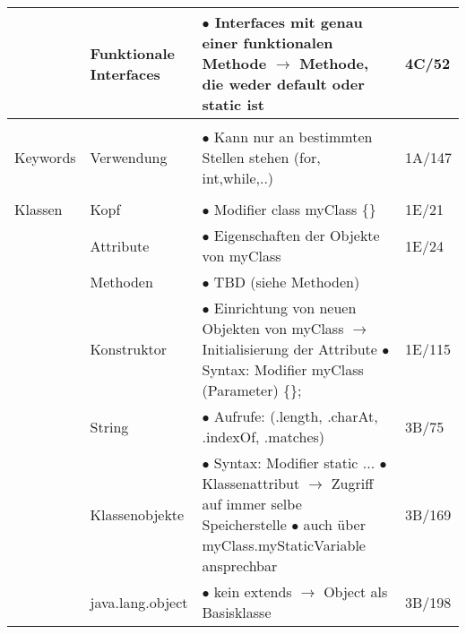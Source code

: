 \documentclass[11pt,a4paper]{article}
\begin{document}
\begin{center}
\begin{longtable}[h]{ | p{2.3cm} | p{2.3cm} | p{12.6cm} | p{1.2cm} | }
	& \makecell[l]{Funktionale \\ Interfaces} & \makecell[l]{$\bullet$ Interfaces mit genau einer funktionalen Methode \\ 
	\hspace{0.4cm} $\rightarrow$ Methode, die weder default oder static ist } & 4C/52 \\
	\hline
	
	
	
	\multicolumn{3}{c}{} \\ 
	\hline 
	
	
	
	{\large Keywords} & Verwendung & $\bullet$ Kann nur an bestimmten Stellen stehen (for, int,while,..) & 1A/147 \\
	\hline
	
	
	
	\multicolumn{3}{c}{} \\ 
	\hline 	
	
	
	
	{\large Klassen} & Kopf & $\bullet$ Modifier class myClass \{\} & 1E/21 \\ \cline{2-4}
	
	& Attribute & $\bullet$ Eigenschaften der Objekte von myClass & 1E/24 \\ \cline{2-4}
	
	& Methoden & $\bullet$ TBD (siehe Methoden) &  \\ \cline{2-4}
	
	& Konstruktor & \makecell[l]{$\bullet$ Einrichtung von neuen Objekten von myClass \\ 
	\hspace{0.4cm} $\rightarrow$ Initialisierung der Attribute\\ 
	$\bullet$ Syntax: Modifier myClass (Parameter) \{\};}& 1E/115 \\ \cline{2-4}
	
	& String & $\bullet$ Aufrufe: (.length, .charAt, .indexOf, .matches) & 3B/75 \\ \cline{2-4}
	
	& Klassenobjekte & \makecell[l]{$\bullet$ Syntax: Modifier static ... \\ 
	$\bullet$ Klassenattribut $\rightarrow$ Zugriff auf immer selbe Speicherstelle \\ 
	$\bullet$ auch über myClass.myStaticVariable ansprechbar} & 3B/169 \\ \cline{2-4}
	
	& java.lang.object & $\bullet$ kein extends $\rightarrow$ Object als Basisklasse & 3B/198 \\ \cline{2-4}
	

\end{longtable}
\end{center}
\end{document}
